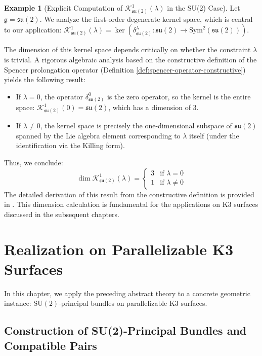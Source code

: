 \documentclass[a4paper,12pt]{extarticle}
\theoremstyle{plain}
\theoremstyle{definition}
\newtheorem{example}{Example}[section]
\begin{document}
\begin{example}[Explicit Computation of $\mathcal{K}_{\mathfrak{su}(2)}^1(\lambda)$ in the SU(2) Case]
\label{ex:su2_kernel_computation}
Let $\mathfrak{g} = \mathfrak{su}(2)$. We analyze the first-order degenerate kernel space, which is central to our application: $\mathcal{K}_{\mathfrak{su}(2)}^1(\lambda) = \ker(\delta^\lambda_{\mathfrak{su}(2)}: \mathfrak{su}(2) \to \mathrm{Sym}^2(\mathfrak{su}(2)))$.

The dimension of this kernel space depends critically on whether the constraint $\lambda$ is trivial. A rigorous algebraic analysis based on the constructive definition of the Spencer prolongation operator (Definition \ref{def:spencer-operator-constructive}) yields the following result:
\begin{itemize}
    \item If $\lambda = 0$, the operator $\delta^0_{\mathfrak{su}(2)}$ is the zero operator, so the kernel is the entire space: $\mathcal{K}_{\mathfrak{su}(2)}^1(0) = \mathfrak{su}(2)$, which has a dimension of 3.
    \item If $\lambda \neq 0$, the kernel space is precisely the one-dimensional subspace of $\mathfrak{su}(2)$ spanned by the Lie algebra element corresponding to $\lambda$ itself (under the identification via the Killing form).
\end{itemize}
Thus, we conclude:
$$ \dim \mathcal{K}_{\mathfrak{su}(2)}^1(\lambda) = \begin{cases} 3 & \text{if } \lambda = 0 \\ 1 & \text{if } \lambda \neq 0 \end{cases} $$
The detailed derivation of this result from the constructive definition is provided in \cite{zheng2025geometric, zheng2025constructing}. This dimension calculation is fundamental for the applications on K3 surfaces discussed in the subsequent chapters.
\end{example}

\section{Realization on Parallelizable K3 Surfaces}
\label{sec:k3_realization}

In this chapter, we apply the preceding abstract theory to a concrete geometric instance: $\mathrm{SU}(2)$-principal bundles on parallelizable K3 surfaces.

\subsection{Construction of SU(2)-Principal Bundles and Compatible Pairs}
\label{sec:su2_construction}
\end{document}
